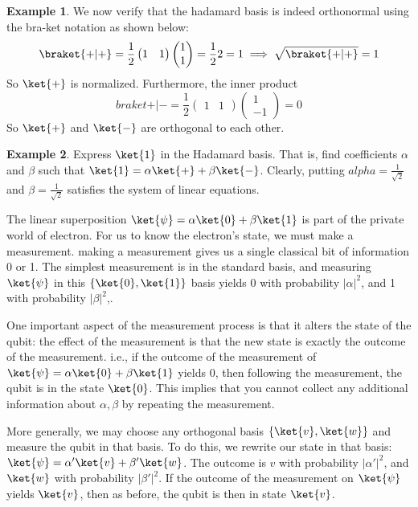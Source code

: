 \documentclass[12pt, oneside]{book}
\theoremstyle{definition}
\theoremstyle{definition}
\newtheorem{example}{Example}[section]
\theoremstyle{remark}
\begin{document}
\begin{example}
    We now verify that the hadamard basis is indeed orthonormal using the bra-ket notation as shown below:
    \[
    \braket{+|+}=\frac{1}{2} \begin{pmatrix} 1 & 1 \end{pmatrix} \begin{pmatrix} 1 \\ 1 \end{pmatrix} =\frac{1}{2}2=1\implies \sqrt{\braket{+|+}}=1
    \]
    So $\ket{+}$ is normalized. Furthermore, the inner product
    \[
    braket{+|-}=\frac{1}{2}\begin{pmatrix} 1 & 1 \end{pmatrix} \begin{pmatrix} 1 \\ -1 \end{pmatrix} = 0
    \]
    So $\ket{+}$ and $\ket{-}$ are orthogonal to each other.
\end{example}

\begin{example}
    Express $\ket{1}$ in the Hadamard basis. That is, find coefficients $\alpha$ and $\beta$ such that $\ket{1}=\alpha\ket{+}+\beta\ket{-}$.
    Clearly, putting $alpha=\frac{1}{\sqrt{2}}$ and $\beta=\frac{1}{\sqrt{2}}$ satisfies the system of linear equations.
\end{example}

The linear superposition $\ket{\psi}=\alpha\ket{0}+\beta \ket{1}$ is part of the private world of electron. For us to know the electron's state, we must make a measurement. making a measurement gives us a single classical bit of information 0 or 1. The simplest measurement is in the standard basis, and measuring $\ket{\psi}$ in this $\{\ket{0},\ket{1}\}$ basis yields 0 with probability $|\alpha|^2$, and 1 with probability $|\beta|^2$,.

One important aspect of the measurement process is that it alters the state of the qubit: the effect of the measurement is that the new state is exactly the outcome of the measurement. i.e., if the outcome of the measurement of $\ket{\psi}=\alpha \ket{0}+\beta\ket{1}$ yields 0, then following the measurement, the qubit is in the state $\ket{0}$. This implies that you cannot collect any additional information about $\alpha,\beta$ by repeating the measurement.

More generally, we may choose any orthogonal basis $\{\ket{v},\ket{w}\}$ and measure the qubit in that basis. To do this, we rewrite our state in that basis: $\ket{\psi}=\alpha'\ket{v}+\beta'\ket{w}$. The outcome is $v$ with probability $|\alpha'|^2$, and $\ket{w}$ with probability $|\beta'|^2$. If the outcome of the measurement on $\ket{\psi}$ yields $\ket{v}$, then as before, the qubit is then in state $\ket{v}$.
\end{document}
